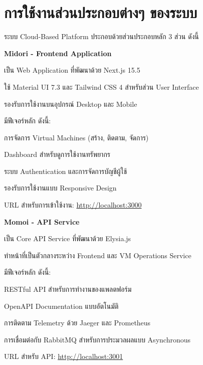 \section{การใช้งานส่วนประกอบต่างๆ ของระบบ}
\hspace*{1.5em}
ระบบ Cloud-Based Platform ประกอบด้วยส่วนประกอบหลัก 3 ส่วน ดังนี้

\vspace{0.5em}
\textbf{Midori - Frontend Application}
\vspace{0.5em}

\begin{mycustomenum2}
    \item เป็น Web Application ที่พัฒนาด้วย Next.js 15.5
    \item ใช้ Material UI 7.3 และ Tailwind CSS 4 สำหรับส่วน User Interface
    \item รองรับการใช้งานบนอุปกรณ์ Desktop และ Mobile
    \item มีฟีเจอร์หลัก ดังนี้:
    \begin{mycustomenum2}
        \item การจัดการ Virtual Machines (สร้าง, ติดตาม, จัดการ)
        \item Dashboard สำหรับดูการใช้งานทรัพยากร
        \item ระบบ Authentication และการจัดการบัญชีผู้ใช้
        \item รองรับการใช้งานแบบ Responsive Design
    \end{mycustomenum2}
    \item URL สำหรับการเข้าใช้งาน: \url{http://localhost:3000}
\end{mycustomenum2}

\vspace{0.5em}
\textbf{Momoi - API Service}
\vspace{0.5em}

\begin{mycustomenum2}
    \item เป็น Core API Service ที่พัฒนาด้วย Elysia.js
    \item ทำหน้าที่เป็นตัวกลางระหว่าง Frontend และ VM Operations Service
    \item มีฟีเจอร์หลัก ดังนี้:
    \begin{mycustomenum2}
        \item RESTful API สำหรับการทำงานของแพลตฟอร์ม
        \item OpenAPI Documentation แบบอัตโนมัติ
        \item การติดตาม Telemetry ด้วย Jaeger และ Prometheus
        \item การเชื่อมต่อกับ RabbitMQ สำหรับการประมวลผลแบบ Asynchronous
    \end{mycustomenum2}
    \item URL สำหรับ API: \url{http://localhost:3001}
\end{mycustomenum2}

